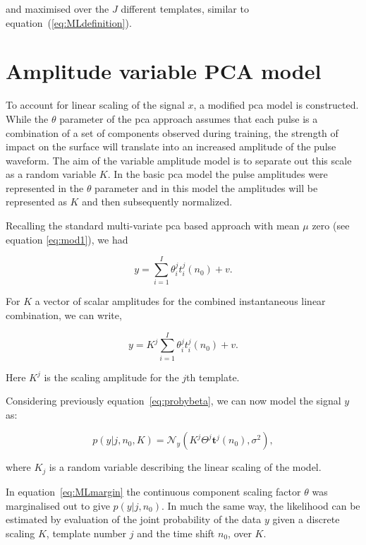 and maximised over the $J$ different templates, similar to equation~(\ref{eq:MLdefinition}).

\section{Amplitude variable PCA model}\label{sec:KamplitudeModel}

To account for linear scaling of the signal $x$, a modified \gls{pca} model is constructed. While the $\theta$ parameter of the \gls{pca} approach assumes that each pulse is a combination of a set of components observed during training, the strength of impact on the surface will translate into an increased amplitude of the pulse waveform. The aim of the variable amplitude model is to separate out this scale as a random variable $K$. In the basic \gls{pca} model the pulse amplitudes were represented in the $\theta$ parameter and in this model the amplitudes will be represented as $K$ and then subsequently normalized.

Recalling the standard multi-variate \gls{pca} based approach with mean $\mu$ zero (see equation \ref{eq:mod1}), we had

\begin{equation}\label{eq:K_PCAmodel}
y = \sum^I_{i=1} \theta^j_i t^j_i(n_0) + v.
\end{equation}

For $K$ a vector of scalar amplitudes for the combined instantaneous linear combination, we can write,

\begin{equation}\label{eq:Kmodel}
y = K^j \sum^I_{i=1} \theta^j_i t^j_i(n_0) + v.
\end{equation}

Here $K^j$ is the scaling amplitude for the $j$th template.

Considering previously equation~\ref{eq:probybeta}, we can now model the signal $y$ as:

\begin{equation}\label{eq:GP2}
    p(y|j,n_0,K) = \mathcal{N}_y(K^j \Theta^j \textbf{t}^j(n_0) , \sigma^2),
\end{equation}

where $K_j$ is a random variable describing the linear scaling of the model.

In equation~\ref{eq:MLmargin} the continuous component scaling factor $\theta$ was marginalised out to give $p(y|j,n_0)$. In much the same way, the likelihood can be estimated by evaluation of the joint probability of the data $y$ given a discrete scaling $K$, template number $j$ and the time shift $n_0$, over $K$.

